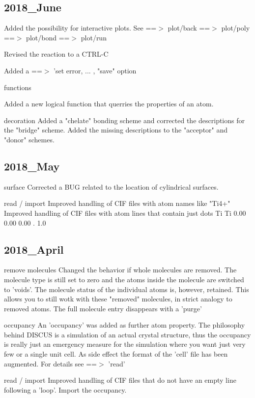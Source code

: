 \subsection*{2018\_June}
\par
Added the possibility for interactive plots. 
See ==$> $ plot/back 
    ==$> $ plot/poly 
    ==$> $ plot/bond 
    ==$> $ plot/run 
\par
Revised the reaction to a CTRL-C 
\par
Added a ==$> $ 'set error, ... , "save" option 
\par
functions 
\par
Added a new logical function that querries the properties of an atom. 
\par
decoration 
Added a "chelate" bonding scheme and corrected the descriptions 
for the "bridge" scheme. 
Added the missing descriptions to the "acceptor" and "donor" 
schemes. 
\subsection*{2018\_May}
\par
surface 
Corrected a BUG related to the location of cylindrical surfaces. 
\par
read / import 
Improved handling of CIF files with atom names like "Ti4+" 
Improved handling of CIF files with atom lines that contain 
just dots 
Ti Ti 0.00 0.00 0.00 . 1.0 
\subsection*{2018\_April}
\par
remove molecules 
Changed the behavior if whole molecules are removed. The 
molecule type is still set to zero and the atoms inside the 
molecule are switched to 'voids'. The molecule status of the 
individual atoms is, however, retained. This allows you to still 
wotk with these "removed" molecules, in strict analogy to 
removed atoms. The full molecule entry disappears with a 'purge' 
\par
occupancy 
An 'occupancy' was added as further atom property. 
The philosophy behind DISCUS is a simulation of an actual 
crystal structure, thus the occupancy is really just an 
emergency measure for the simulation where you want just 
very few or a single unit cell. 
As side effect the format of the 'cell' file has been 
augmented. 
For details see ==$> $ 'read' 
\par
read / import 
Improved handling of CIF files that do not have an empty 
line following a 'loop'. 
Import the occupancy. 
